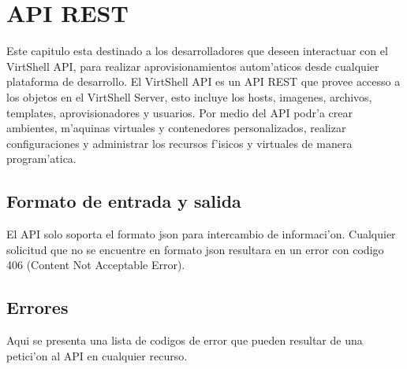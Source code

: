 \chapter{API REST}
\label{capapi}

Este capitulo esta destinado a los desarrolladores que deseen interactuar con el VirtShell API, para realizar aprovisionamientos autom'aticos desde cualquier plataforma de desarrollo. El VirtShell API es un API REST que provee accesso a los objetos en el VirtShell Server, esto incluye los hosts, imagenes, archivos, templates, aprovisionadores y usuarios. Por medio del API podr'a crear ambientes, m'aquinas virtuales y contenedores personalizados, realizar configuraciones y administrar los recursos f'isicos y virtuales de manera program'atica. 

\section{Formato de entrada y salida}
El API solo soporta el formato json para intercambio de informaci'on. Cualquier solicitud que no se encuentre en formato json resultara en un error con codigo 406 (Content Not Acceptable Error).

\section{Errores}
Aqui se presenta una lista de codigos de error que pueden resultar de una petici'on al API en cualquier recurso.

